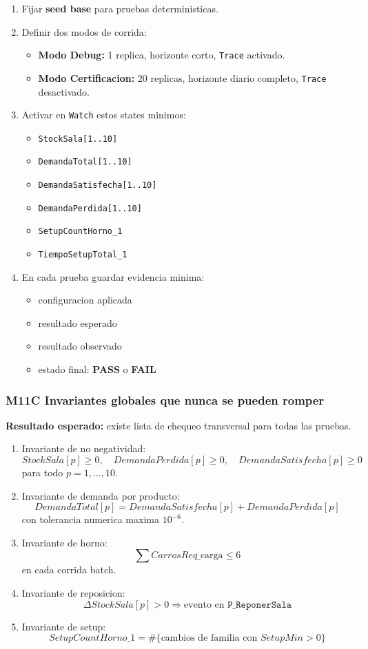 \documentclass[11pt]{article}
\newcommand{\simio}[1]{\texttt{#1}}
\newcommand{\state}[1]{\texttt{#1}}
\newcommand{\proc}[1]{\texttt{#1}}
\begin{document}
\begin{enumerate}
  \item Fijar \textbf{seed base} para pruebas deterministicas.
  \item Definir dos modos de corrida:
  \begin{itemize}
    \item \textbf{Modo Debug:} 1 replica, horizonte corto, \simio{Trace} activado.
    \item \textbf{Modo Certificacion:} 20 replicas, horizonte diario completo, \simio{Trace} desactivado.
  \end{itemize}
  \item Activar en \simio{Watch} estos states minimos:
  \begin{itemize}
    \item \state{StockSala[1..10]}
    \item \state{DemandaTotal[1..10]}
    \item \state{DemandaSatisfecha[1..10]}
    \item \state{DemandaPerdida[1..10]}
    \item \state{SetupCountHorno\_1}
    \item \state{TiempoSetupTotal\_1}
  \end{itemize}
  \item En cada prueba guardar evidencia minima:
  \begin{itemize}
    \item configuracion aplicada
    \item resultado esperado
    \item resultado observado
    \item estado final: \textbf{PASS} o \textbf{FAIL}
  \end{itemize}
\end{enumerate}

\subsubsection{M11C Invariantes globales que nunca se pueden romper}
\textbf{Resultado esperado:} existe lista de chequeo transversal para todas las pruebas.

\begin{enumerate}
  \item Invariante de no negatividad:
  \[
  StockSala[p] \ge 0,\quad DemandaPerdida[p] \ge 0,\quad DemandaSatisfecha[p] \ge 0
  \]
  para todo \(p=1,\ldots,10\).
  \item Invariante de demanda por producto:
  \[
  DemandaTotal[p] = DemandaSatisfecha[p] + DemandaPerdida[p]
  \]
  con tolerancia numerica maxima \(10^{-6}\).
  \item Invariante de horno:
  \[
  \sum CarrosReq\_\text{carga} \le 6
  \]
  en cada corrida batch.
  \item Invariante de reposicion:
  \[
  \Delta StockSala[p] > 0 \Rightarrow \text{evento en } \proc{P\_ReponerSala}
  \]
  \item Invariante de setup:
  \[
  SetupCountHorno\_1 = \#\{\text{cambios de familia con } SetupMin>0\}
  \]
\end{enumerate}
\end{document}
